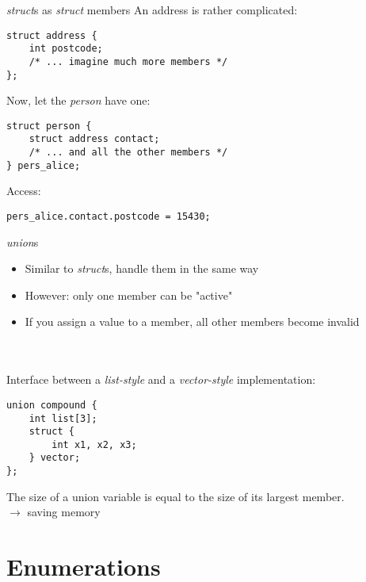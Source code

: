 \begin{frame}[fragile]{\textit{struct}s as \textit{struct} members}
	An address is rather complicated:
	\begin{lstlisting}[numbers=none]
struct address {
	int postcode;
	/* ... imagine much more members */
};
\end{lstlisting}
	Now, let the \textit{person} have one:
	\begin{lstlisting}[numbers=none]
struct person {
	struct address contact;
	/* ... and all the other members */
} pers_alice;
\end{lstlisting}
	Access:
\begin{lstlisting}[numbers=none]
pers_alice.contact.postcode = 15430;
\end{lstlisting}
\end{frame}
\begin{frame}[fragile]{\textit{union}s}
	\begin{itemize}
		\item Similar to \textit{struct}s, handle them in the same way
		\item However: only one member can be "active"
		\item If you assign a value to a member, all other members become invalid
	\end{itemize} \ \\ \ \\
	Interface between a \textit{list-style} and a \textit{vector-style} implementation:
	\begin{lstlisting}[numbers=none]
union compound {
	int list[3];
	struct {
		int x1, x2, x3;
	} vector;
};
\end{lstlisting}
	The size of a union variable is equal to the size of its largest member.\\
	$\rightarrow$ saving memory
\end{frame}
\section{Enumerations}
